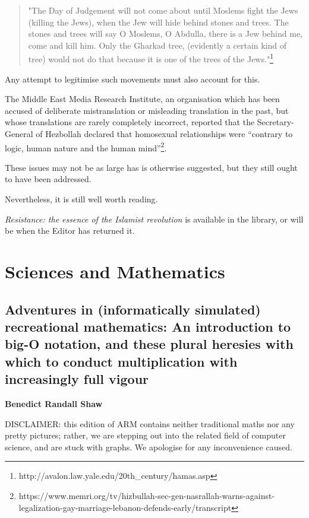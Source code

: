 \documentclass[12pt,a4paper]{report}
\newcounter{count}
\begin{document}
\begin{multicols}{2}
\begin{multicols}{2}
\begin{quote}
	"The Day of Judgement will not come about until Moslems fight the Jews
	(killing the Jews), when the Jew will hide behind stones and trees. The
	stones and trees will say O Moslems, O Abdulla, there is a Jew behind
	me, come and kill him. Only the Gharkad tree, (evidently a certain kind
	of tree) would not do that because it is one of the trees of the
	Jews."\footnote{http://avalon.law.yale.edu/20th\_century/hamas.asp}
\end{quote}

Any attempt to legitimise such movements must also account for this.

The Middle East Media Research Institute, an organisation which has been
accused of deliberate mistranslation or misleading translation in the
past, but whose translations are rarely completely incorrect, reported
that the Secretary-General of Hezbollah declared that homosexual
relationships were ``contrary to logic, human nature and the human
mind''\footnote{https://www.memri.org/tv/hizbullah-sec-gen-nasrallah-warns-against-legalization-gay-marriage-lebanon-defends-early/transcript}.

These issues may not be as large has is otherwise suggested, but they
still ought to have been addressed.

Nevertheless, it is still well worth reading.

\textit{Resistance: the essence of the Islamist revolution} is available
in the library, or will be when the Editor has returned it.

\end{multicols}

\chapter{Sciences and Mathematics}

\section{Adventures in (informatically simulated) recreational mathematics: An introduction to big-O notation, and these plural heresies with which to conduct multiplication with increasingly full vigour}

\textbf{Benedict Randall Shaw}

\begin{multicols}{2}

DISCLAIMER: this edition of ARM contains neither traditional maths nor any pretty pictures; rather, we are stepping out into the related field of computer science, and are stuck with graphs. We apologise for any inconvenience caused.


\end{multicols}
\end{multicols}
\end{document}
